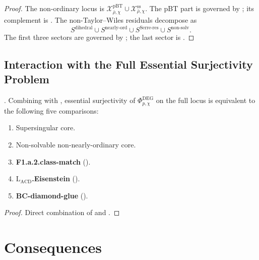 \begin{proof}
The non-ordinary locus is
\(\mathcal{X}^{\mathrm{pBT}}_{\bar\rho,\chi}\cup
\mathcal{X}^{\mathrm{ss}}_{\bar\rho,\chi}\). The pBT part is governed by
; its complement is
. The non-Taylor--Wiles
residuals decompose as
\[
S^{\mathrm{dihedral}}\cup S^{\mathrm{nearly\text{-}ord}}\cup
S^{\mathrm{Serre\text{-}res}}\cup S^{\mathrm{non\text{-}solv}}.
\]
The first three sectors are governed by
; the last sector is
.
\end{proof}

\subsection{Interaction with the Full Essential Surjectivity Problem}

\begin{proposition}
\label{v4-arith:w6-e:prop:F1-table-combined}
\ClaimStatusProvedHere. Combining
 with
, essential surjectivity of
\(\Phi^{\mathrm{DEG}}_{p,\chi}\) on the full locus is equivalent to the
following five comparisons:
\begin{enumerate}
\item Supersingular core.
\item Non-solvable non-nearly-ordinary core.
\item \textbf{F1.a.2.class-match}
().
\item \textbf{\(\mathrm{L}_{\mathrm{ACD}}\).Eisenstein}
().
\item \textbf{BC-diamond-glue}
().
\end{enumerate}
\end{proposition}

\begin{proof}
Direct combination of 
and .
\end{proof}

\section{Consequences}
\label{v4-arith:w6-e:summary}


